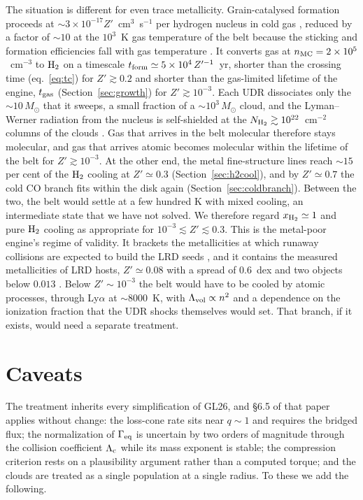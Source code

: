 \documentclass[twocolumn,pdftex]{aastex701}
\newcommand{\msun}{M_{\odot}}
\newcommand{\xhh}{x_{\rm H_2}}
\newcommand{\Zp}{Z'}
\newcommand{\Geq}{\Gamma_{\rm eq}}
\newcommand{\GL}{GL26}
\newcommand{\Htwo}{{\rm H_2}}
\begin{document}
The situation is different for even trace metallicity. Grain-catalysed formation proceeds at $\sim3\times10^{-17}\Zp$~cm$^{3}$~s$^{-1}$ per hydrogen nucleus in cold gas \citep{Hollenbach:1979a}, reduced by a factor of $\sim10$ at the $10^{3}$~K gas temperature of the belt because the sticking and formation efficiencies fall with gas temperature \citep{Hollenbach:1979a,Cazaux:2004a}. It converts gas at $n_{\rm MC} = 2\times10^{5}$~cm$^{-3}$ to $\Htwo$ on a timescale $t_{\rm form}\simeq5\times10^{4}\,\Zp^{-1}$~yr, shorter than the crossing time (eq.~\ref{eq:tc}) for $\Zp\gtrsim0.2$ and shorter than the gas-limited lifetime of the engine, $t_{\rm gas}$ (Section~\ref{sec:growth}) for $\Zp\gtrsim10^{-3}$. Each UDR dissociates only the $\sim10\,\msun$ that it sweeps, a small fraction of a $\sim10^{3}\,\msun$ cloud, and the Lyman--Werner radiation from the nucleus is self-shielded at the $N_{\Htwo}\gtrsim10^{22}$~cm$^{-2}$ columns of the clouds \citep{Draine:1996a,Wolcott-Green:2011a}. Gas that arrives in the belt molecular therefore stays molecular, and gas that arrives atomic becomes molecular within the lifetime of the belt for $\Zp\gtrsim10^{-3}$. At the other end, the metal fine-structure lines reach $\sim15$ per cent of the $\Htwo$ cooling at $\Zp\simeq0.3$ (Section~\ref{sec:h2cool}), and by $\Zp\simeq0.7$ the cold CO branch fits within the disk again (Section~\ref{sec:coldbranch}). Between the two, the belt would settle at a few hundred K with mixed cooling, an intermediate state that we have not solved. We therefore regard $\xhh\simeq1$ and pure $\Htwo$ cooling as appropriate for $10^{-3}\lesssim\Zp\lesssim0.3$. This is the metal-poor engine's regime of validity. It brackets the metallicities at which runaway collisions are expected to build the LRD seeds \citep{Pacucci:2025a,Inayoshi:2020a}, and it contains the measured metallicities of LRD hosts, $\Zp\simeq0.08$ with a spread of 0.6~dex and two objects below $0.013$ \citep{Nikopoulos:2026a}. Below $\Zp\sim10^{-3}$ the belt would have to be cooled by atomic processes, through Ly$\alpha$ at $\sim8000$~K, with $\Lambda_{\rm vol}\propto n^{2}$ and a dependence on the ionization fraction that the UDR shocks themselves would set. That branch, if it exists, would need a separate treatment.

\section{Caveats}\label{sec:caveats}

The treatment inherits every simplification of \GL, and \S6.5 of that paper applies without change: the loss-cone rate sits near $q\sim1$ and requires the bridged flux; the normalization of $\Geq$ is uncertain by two orders of magnitude through the collision coefficient $\Lambda_{\rm c}$ while its mass exponent is stable; the compression criterion rests on a plausibility argument rather than a computed torque; and the clouds are treated as a single population at a single radius. To these we add the following.
\end{document}
